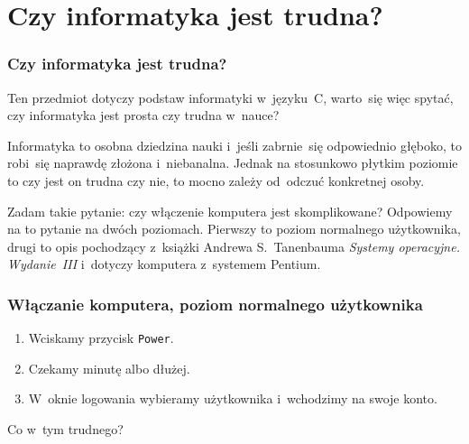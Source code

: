 \documentclass[10pt,t]{beamer}
\begin{document}
\section{Czy informatyka jest trudna?}



\begin{frame}
  \frametitle{Czy informatyka jest trudna?}


  Ten przedmiot dotyczy podstaw informatyki w~języku~C, warto~się
  więc spytać, czy informatyka jest prosta czy trudna w~nauce?

  Informatyka to osobna dziedzina nauki i~jeśli zabrnie~się odpowiednio
  głęboko, to robi~się naprawdę złożona i~niebanalna. Jednak na stosunkowo
  płytkim poziomie to czy jest on trudna czy nie, to mocno zależy od~odczuć
  konkretnej osoby.

  Zadam takie pytanie: czy włączenie komputera jest skomplikowane?
  Odpowiemy na to pytanie na dwóch poziomach. Pierwszy to poziom normalnego
  użytkownika, drugi to opis pochodzący z~książki Andrewa S.~Tanenbauma
  \textit{Systemy operacyjne. Wydanie~III}
  \parencite{Tannenbaum-Systemy-Operacyjne-Wydanie-III-Pub-2013}
  i~dotyczy komputera z~systemem Pentium.

\end{frame}





\begin{frame}
  \frametitle{Włączanie komputera, poziom normalnego użytkownika}


  \begin{enumerate}

  \item Wciskamy przycisk \texttt{Power}.

  \item Czekamy minutę albo dłużej.

  \item W~oknie logowania wybieramy użytkownika i~wchodzimy na swoje konto.

  \end{enumerate}

  Co w~tym trudnego?

\end{frame}
\end{document}
